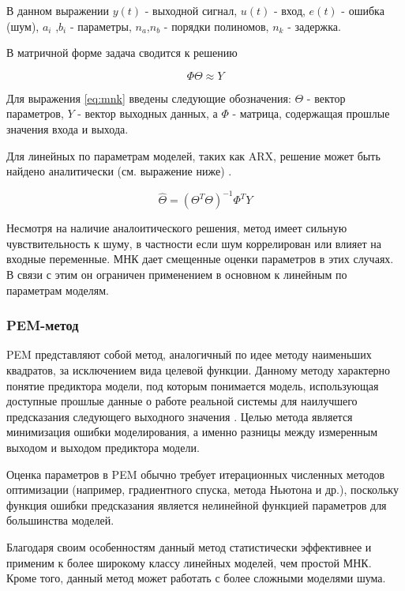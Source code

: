 В данном выражении $ y(t) $ - выходной сигнал,  $u(t)$ - вход, $e(t)$ - ошибка (шум), $a_i$ ,$b_i$ - параметры, $n_a$,$n_b$ - порядки полиномов, $n_k$ - задержка.

В матричной форме задача сводится к решению

\begin{equation}
  \Phi\Theta \approx Y
  \label{eq:mnk}
\end{equation}

Для выражения \ref{eq:mnk} введены следующие обозначения: $\Theta$ - вектор
параметров, $Y$ - вектор выходных данных, а $\Phi$ - матрица, содержащая
прошлые значения входа и выхода.

Для линейных по параметрам моделей, таких как ARX, решение может быть найдено
аналитически (см. выражение ниже) \cite{bib:arx}.

\begin{equation}
  \hat{\Theta} = (\Theta^T \Theta)^{-1} \Phi^T Y
  \label{eq:mnk_arx_sol}
\end{equation}

Несмотря на наличие аналоитического решения,
метод имеет сильную чувствительность к шуму,
в частности если шум коррелирован или влияет
на входные переменные. МНК дает смещенные
оценки параметров в этих случаях. В связи с
этим он ограничен применением в основном к
линейным по параметрам моделям.

\subsubsection{PEM-метод}

PEM представляют собой метод, аналогичный по идее методу наименьших квадратов,
за исключением вида целевой функции. Данному методу характерно понятие
предиктора модели, под которым понимается модель, использующая доступные
прошлые данные о работе реальной системы для наилучшего предсказания следующего
выходного значения \cite{bib:ident:neural:SVD}. Целью метода является минимизация ошибки моделирования, а
именно разницы между измеренным выходом и выходом предиктора модели. 

Оценка параметров в PEM обычно требует итерационных численных методов
оптимизации (например, градиентного спуска, метода Ньютона и др.), поскольку
функция ошибки предсказания является нелинейной функцией параметров для
большинства моделей. 

Благодаря своим особенностям данный метод статистически эффективнее и применим
к более широкому классу линейных моделей, чем простой МНК. Кроме того, данный
метод может работать с более сложными моделями шума.

